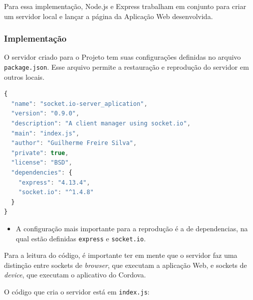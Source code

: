 \documentclass[a4paper,12pt]{article}
\newcommand{\code}[1]{\lstinline[mathescape=true, columns=fixed, basicstyle={\small\ttfamily}]{#1}}
\begin{document}
Para essa implementação, Node.js e Express trabalham em conjunto para criar um servidor local e lançar a página da Aplicação Web desenvolvida.

\subsubsection{Implementação}

O servidor criado para o Projeto tem suas configurações definidas no arquivo \code{package.json}. Esse arquivo permite a restauração e reprodução do servidor em outros locais.


\begin{lstlisting}[language=JavaScript]
{
  "name": "socket.io-server_aplication",
  "version": "0.9.0",
  "description": "A client manager using socket.io",
  "main": "index.js",
  "author": "Guilherme Freire Silva",
  "private": true,
  "license": "BSD",
  "dependencies": {
    "express": "4.13.4",
    "socket.io": "^1.4.8"
  }
}

\end{lstlisting}

\begin{itemize}
  \item A configuração mais importante para a reprodução é a de dependencias, na qual estão definidas \code{express} e \code{socket.io}.
\end{itemize}

Para a leitura do código, é importante ter em mente que o servidor faz uma distinção entre sockets de \emph{browser}, que executam a aplicação Web, e sockets de \emph{device}, que executam o aplicativo do Cordova.

O código que cria o servidor está em \code{index.js}:
\end{document}
